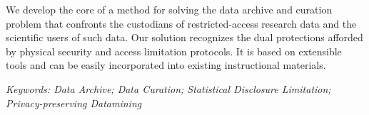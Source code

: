 

We develop the core of a method for solving the data archive and curation problem that confronts the 
custodians of restricted-access research data and the scientific users of such data. 
Our solution recognizes the dual protections afforded by physical security and access limitation protocols.
It is based on extensible tools and can be easily incorporated into existing instructional materials.

{ \it Keywords: 
Data Archive; Data Curation; Statistical Disclosure Limitation; Privacy-preserving Datamining}
